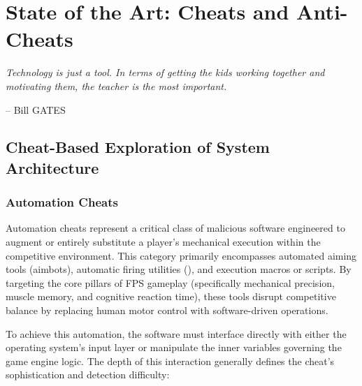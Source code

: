 \chapter{State of the Art: Cheats and Anti-Cheats}

\label{chap:one}

\epigraph{\itshape Technology is just a tool. In terms of getting the kids working together and motivating them, the teacher is the most important.}{-- Bill GATES}

\startcontents[chapters]

\printMyMinitoc

\fancyhead[LE]{\textsc{\chaptername~\thechapter}}

\section{Cheat-Based Exploration of System Architecture}
\label{sec:one:one}

\subsection{Automation Cheats}
\label{sec:one:one:one}

Automation cheats represent a critical class of malicious software engineered to augment or entirely substitute a player's mechanical execution within the competitive environment. This category primarily encompasses automated aiming tools (aimbots), automatic firing utilities (), and execution macros or \glspl{script}. By targeting the core pillars of FPS gameplay (specifically mechanical precision, muscle memory, and cognitive reaction time), these tools disrupt competitive balance by replacing human motor control with software-driven operations.

To achieve this automation, the software must interface directly with either the operating system's input layer or manipulate the inner variables governing the game engine logic. The depth of this interaction generally defines the cheat's sophistication and detection difficulty:

